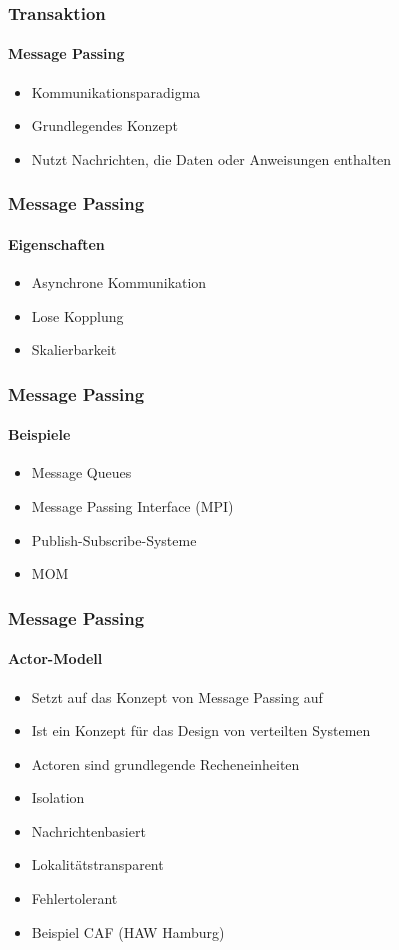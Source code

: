 \begin{frame}
  \frametitle{Transaktion}
  \framesubtitle{Message Passing}
  \begin{itemize}
    \item Kommunikationsparadigma
    \item Grundlegendes Konzept
    \item Nutzt Nachrichten, die Daten oder Anweisungen enthalten
  \end{itemize}
\end{frame}

\begin{frame}
  \frametitle{Message Passing}
  \framesubtitle{Eigenschaften}
  \begin{itemize}
    \item Asynchrone Kommunikation
    \item Lose Kopplung
    \item Skalierbarkeit
  \end{itemize}
\end{frame}

\begin{frame}
  \frametitle{Message Passing}
  \framesubtitle{Beispiele}
  \begin{itemize}
    \item Message Queues
    \item Message Passing Interface (MPI)
    \item Publish-Subscribe-Systeme
    \item MOM
  \end{itemize}
\end{frame}

\begin{frame}
  \frametitle{Message Passing}
  \framesubtitle{Actor-Modell}
  \begin{itemize}
    \item Setzt auf das Konzept von Message Passing auf
    \item Ist ein Konzept für das Design von verteilten Systemen
    \item Actoren sind grundlegende Recheneinheiten
    \item Isolation
    \item Nachrichtenbasiert
    \item Lokalitätstransparent
    \item Fehlertolerant
    \item Beispiel CAF (HAW Hamburg)
  \end{itemize}
\end{frame}

